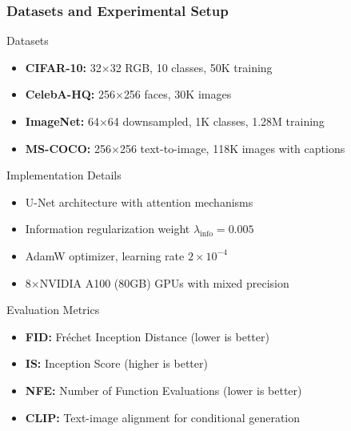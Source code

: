 \documentclass[aspectratio=169]{beamer}
\begin{document}
\begin{frame}
\frametitle{Datasets and Experimental Setup}
\begin{block}{Datasets}
\begin{itemize}
\item \textbf{CIFAR-10:} 32$\times$32 RGB, 10 classes, 50K training
\item \textbf{CelebA-HQ:} 256$\times$256 faces, 30K images
\item \textbf{ImageNet:} 64$\times$64 downsampled, 1K classes, 1.28M training
\item \textbf{MS-COCO:} 256$\times$256 text-to-image, 118K images with captions
\end{itemize}
\end{block}

\begin{block}{Implementation Details}
\begin{itemize}
\item U-Net architecture with attention mechanisms
\item Information regularization weight $\lambda_{\text{info}} = 0.005$
\item AdamW optimizer, learning rate $2 \times 10^{-4}$
\item 8$\times$NVIDIA A100 (80GB) GPUs with mixed precision
\end{itemize}
\end{block}

\begin{block}{Evaluation Metrics}
\begin{itemize}
\item \textbf{FID:} Fr\'echet Inception Distance (lower is better)
\item \textbf{IS:} Inception Score (higher is better)
\item \textbf{NFE:} Number of Function Evaluations (lower is better)
\item \textbf{CLIP:} Text-image alignment for conditional generation
\end{itemize}
\end{block}
\end{frame}
\end{document}
